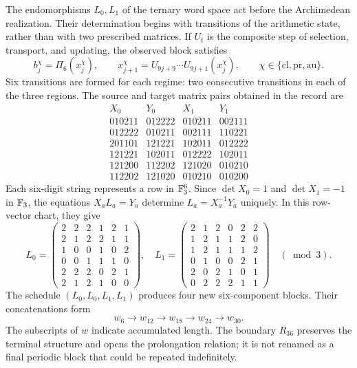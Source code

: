 The endomorphisms \(L_0,L_1\) of the ternary word space act before the Archimedean realization. Their determination begins with transitions of the arithmetic state, rather than with two prescribed matrices. If \(U_t\) is the composite step of selection, transport, and updating, the observed block satisfies
\[
 b_j^\chi=\Pi_6(x_j^\chi),\qquad
 x_{j+1}^\chi=U_{9j+9}\cdots U_{9j+1}(x_j^\chi),
 \qquad \chi\in\{\mathrm{cl},\mathrm{pr},\mathrm{au}\}.
\]
Six transitions are formed for each regime: two consecutive transitions in each of the three regions. The source and target matrix pairs obtained in the record are
\[
\begin{array}{c|c|c|c}
X_0&Y_0&X_1&Y_1\\\hline
010211&012222&010211&002111\\
012222&010211&002111&110221\\
201101&121221&102011&012222\\
121221&102011&012222&102011\\
121200&112202&121020&010210\\
112202&121020&010210&010200
\end{array}
\]
Each six-digit string represents a row in \(\mathbb F_3^6\). Since \(\det X_0=1\) and \(\det X_1=-1\) in \(\mathbb F_3\), the equations \(X_aL_a=Y_a\) determine \(L_a=X_a^{-1}Y_a\) uniquely. In this row-vector chart, they give
\[
 L_0=\begin{pmatrix}
 2&2&2&1&2&1\\2&1&2&2&1&1\\1&0&0&1&0&2\\
 0&0&1&1&1&0\\2&2&2&0&2&1\\2&1&2&1&0&0
 \end{pmatrix},\quad
 L_1=\begin{pmatrix}
 2&1&2&0&2&2\\1&2&1&1&2&0\\1&2&1&1&1&2\\
 0&1&0&0&2&1\\2&0&2&1&0&1\\0&2&2&2&1&1
 \end{pmatrix}\quad(\bmod3).
\]
The schedule \((L_0,L_0,L_1,L_1)\) produces four new six-component blocks. Their concatenations form
\[
 w_6\longrightarrow w_{12}\longrightarrow w_{18}
 \longrightarrow w_{24}\longrightarrow w_{30}.
\]
The subscripts of \(w\) indicate accumulated length. The boundary \(R_{36}\) preserves the terminal structure and opens the prolongation relation; it is not renamed as a final periodic block that could be repeated indefinitely.

